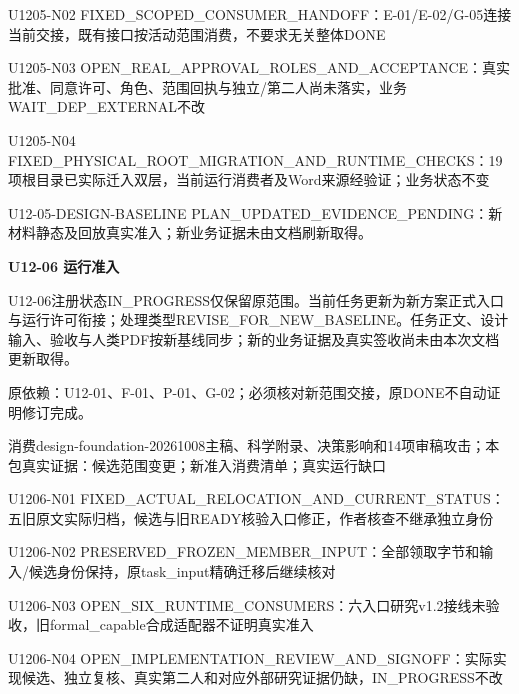 \documentclass[11pt,a4paper]{article}
\newcommand{\reviewsection}[1]{\par\Needspace{5\baselineskip}\vspace{10pt}\begin{center}{\titlelatin\titlecjk\bfseries\fontsize{14}{20}\selectfont #1}\end{center}}
\begin{document}
U1205-\allowbreak{}N02 FIXED\_\allowbreak{}SCOPED\_\allowbreak{}CONSUMER\_\allowbreak{}HANDOFF：E-\allowbreak{}01/\allowbreak{}E-\allowbreak{}02/\allowbreak{}G-\allowbreak{}05连接当前交接，既有接口按活动范围消费，不要求无关整体DONE


U1205-\allowbreak{}N03 OPEN\_\allowbreak{}REAL\_\allowbreak{}APPROVAL\_\allowbreak{}ROLES\_\allowbreak{}AND\_\allowbreak{}ACCEPTANCE：真实批准、同意许可、角色、范围回执与独立/\allowbreak{}第二人尚未落实，业务WAIT\_\allowbreak{}DEP\_\allowbreak{}EXTERNAL不改


U1205-\allowbreak{}N04 FIXED\_\allowbreak{}PHYSICAL\_\allowbreak{}ROOT\_\allowbreak{}MIGRATION\_\allowbreak{}AND\_\allowbreak{}RUNTIME\_\allowbreak{}CHECKS：19项根目录已实际迁入双层，当前运行消费者及Word来源经验证；业务状态不变


U12-\allowbreak{}05-\allowbreak{}DESIGN-\allowbreak{}BASELINE PLAN\_\allowbreak{}UPDATED\_\allowbreak{}EVIDENCE\_\allowbreak{}PENDING：新材料静态及回放真实准入；新业务证据未由文档刷新取得。


\reviewsection{U12-\allowbreak{}06 运行准入}
U12-\allowbreak{}06注册状态IN\_\allowbreak{}PROGRESS仅保留原范围。当前任务更新为新方案正式入口与运行许可衔接；处理类型REVISE\_\allowbreak{}FOR\_\allowbreak{}NEW\_\allowbreak{}BASELINE。任务正文、设计输入、验收与人类PDF按新基线同步；新的业务证据及真实签收尚未由本次文档更新取得。


原依赖：U12-\allowbreak{}01、F-\allowbreak{}01、P-\allowbreak{}01、G-\allowbreak{}02；必须核对新范围交接，原DONE不自动证明修订完成。


消费design-\allowbreak{}foundation-\allowbreak{}20261008主稿、科学附录、决策影响和14项审稿攻击；本包真实证据：候选范围变更；新准入消费清单；真实运行缺口


U1206-\allowbreak{}N01 FIXED\_\allowbreak{}ACTUAL\_\allowbreak{}RELOCATION\_\allowbreak{}AND\_\allowbreak{}CURRENT\_\allowbreak{}STATUS：五旧原文实际归档，候选与旧READY核验入口修正，作者核查不继承独立身份


U1206-\allowbreak{}N02 PRESERVED\_\allowbreak{}FROZEN\_\allowbreak{}MEMBER\_\allowbreak{}INPUT：全部领取字节和输入/\allowbreak{}候选身份保持，原task\_\allowbreak{}input精确迁移后继续核对


U1206-\allowbreak{}N03 OPEN\_\allowbreak{}SIX\_\allowbreak{}RUNTIME\_\allowbreak{}CONSUMERS：六入口研究v1.2接线未验收，旧formal\_\allowbreak{}capable合成适配器不证明真实准入


U1206-\allowbreak{}N04 OPEN\_\allowbreak{}IMPLEMENTATION\_\allowbreak{}REVIEW\_\allowbreak{}AND\_\allowbreak{}SIGNOFF：实际实现候选、独立复核、真实第二人和对应外部研究证据仍缺，IN\_\allowbreak{}PROGRESS不改
\end{document}
